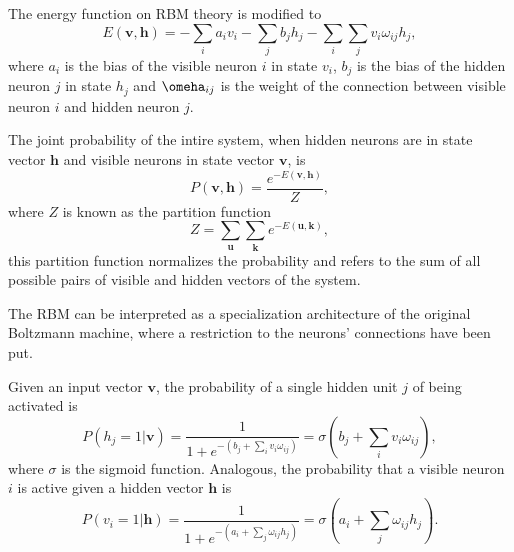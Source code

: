 The energy function on RBM theory is modified to
\begin{equation}
    \label{eq:rubik-state-energy-rbm}
    E(\mathbf{v}, \mathbf{h}) = - \sum_{i} a_{i} v_{i} - \sum_{j} b_{j} h_{j} - \sum_{i} \sum_{j} v_{i} \omega_{ij} h_{j},
\end{equation}
where $a_{i}$ is the bias of the visible neuron $i$ in state $v_{i}$, $b_{j}$ is the bias of the hidden neuron $j$ in state $h_{j}$ and $\omeha_{ij}$ is the weight of the connection between visible neuron $i$ and hidden neuron $j$.

The joint probability of the intire system, when hidden neurons are in state vector $\mathbf{h}$ and visible neurons in state vector $\mathbf{v}$, is
\begin{equation}
    \label{eq:rubik-prob-rbm}
    P(\mathbf{v}, \mathbf{h}) = \frac{e^{-E(\mathbf{v}, \mathbf{h})}}{Z},
\end{equation}
where $Z$ is known as the partition function
\begin{equation}
    \label{eq:rubik-partition-func-rbm}
    Z = \sum_{\mathbf{u}} \sum_{\mathbf{k}} e^{-E(\mathbf{u}, \mathbf{k})},
\end{equation}
this partition function normalizes the probability and refers to the sum of all possible pairs of visible and hidden vectors of the system.

The RBM can be interpreted as a specialization architecture of the original Boltzmann machine, where a restriction to the neurons' connections have been put.

Given an input vector $\mathbf{v}$, the probability of a single hidden unit $j$ of being activated is 
\begin{equation}
    \label{eq:rubik-prob-hidden-active}
    P(h_{j} = 1 | \mathbf{v}) = \frac{1}{1 + e^{- \left( b_{j} + \sum_{i} v_{i} \omega_{ij} \right)}} = \sigma \left( b_{j} + \sum_{i} v_{i} \omega_{ij} \right),
\end{equation}
where $\sigma$ is the sigmoid function.
Analogous, the probability that a visible neuron $i$ is active given a hidden vector $\mathbf{h}$ is
\begin{equation}
    \label{eq:rubik-prob-visible-active}
    P(v_{i} = 1 | \mathbf{h}) = \frac{1}{1 + e^{- \left( a_{i} + \sum_{j} \omega_{ij} h_{j} \right)}} = \sigma \left( a_{i} + \sum_{j} \omega_{ij} h_{j} \right).
\end{equation}


